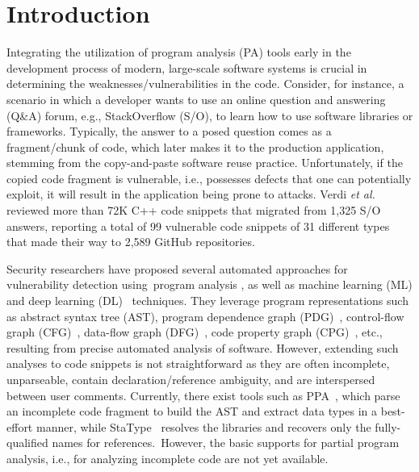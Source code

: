 \section{Introduction}
Integrating the utilization of program analysis (PA) tools early in the development process of modern, large-scale software systems is crucial in determining the weaknesses/vulnerabilities in the code. Consider, for instance, a scenario in which a developer wants to use an online question and answering (Q\&A) forum, e.g., StackOverflow (S/O), to learn how to use software libraries or frameworks. Typically, the answer to a posed question comes as a fragment/chunk of code, which later makes it to the production application, stemming from the copy-and-paste software reuse practice. Unfortunately, if the copied code fragment is vulnerable, i.e., possesses defects that one can potentially exploit, it will result in the application being prone to attacks. Verdi {\em et al.}~\cite{verdi-tse22}
reviewed more than 72K C++ code snippets that migrated from 1,325 S/O answers, reporting a total of 99 vulnerable code snippets of 31 different types that made their way to 2,589 GitHub repositories.

Security researchers have proposed several automated approaches for
vulnerability detection using~program
analysis \cite{FlawFinder,RATS,viega2000its4,Checkmarx,HPFortify,Coverity,BufferOverFlow,SQLInj,Cross-siteScripting,AuthBypassSpoofing},
as well as machine learning (ML) and deep learning
(DL)~\cite{fse21,chakraborty2020deep,zhou2019devign,li2018sysevr,li2018vuldeepecker}
techniques. They leverage program representations such as
abstract syntax tree (AST), program dependence graph
(PDG)~\cite{fse21,li2018vuldeepecker}, control-flow graph
(CFG)~\cite{zhou2019devign}, data-flow graph
(DFG)~\cite{zhou2019devign}, code property graph
(CPG)~\cite{chakraborty2020deep}, etc., resulting from precise
automated analysis of software. However, extending such analyses to
code snippets is not straightforward as they are often incomplete,
unparseable, contain declaration/reference ambiguity, and are
interspersed between user comments. Currently, there exist tools such
as PPA~\cite{ppa08}, which parse an incomplete code fragment to build
the AST and extract data types in a best-effort manner, while
StaType~\cite{icse18} resolves the libraries and recovers only the
fully-qualified names for references.~However, the basic supports for
partial program analysis, i.e., for analyzing incomplete code are not
yet available.

